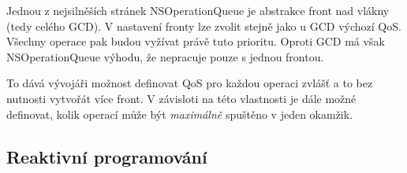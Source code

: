 Jednou z nejsilněších stránek NSOperationQueue je abstrakce front nad vlákny (tedy celého GCD).
V nastavení fronty lze zvolit stejně jako u GCD výchozí QoS.
Všechny operace pak budou vyžívat právě tuto prioritu.
Oproti GCD má však NSOperationQueue výhodu, že nepracuje pouze s jednou frontou.

To dává vývojáři možnost definovat QoS pro každou operaci zvlášť a to bez nutnosti vytvořát více front.
V závisloti na této vlastnosti je dále možné definovat, kolik operací může být \textit{maximálně} spuštěno v jeden okamžik.

\subsection{Reaktivní programování}\label{vlakna-rac}

